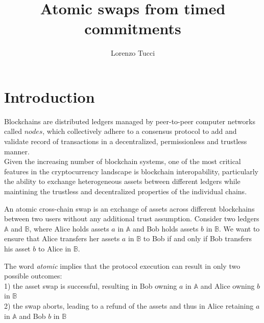 \documentclass{article}      	%
\begin{document}
         
\author{Lorenzo Tucci}
\title{Atomic swaps from timed commitments}

\maketitle

\tableofcontents
\newpage
\section{Introduction}

Blockchains are distributed ledgers managed by peer-to-peer computer networks called $nodes$, which collectively adhere to a consensus protocol to add and validate record of transactions in a decentralized, permissionless and trustless manner. \\
Given the increasing number of blockchain systems, one of the most critical features in the cryptocurrency landscape is blockchain interopability, particularly the ability to exchange heterogeneous assets between different ledgers while maintining the trustless and decentralized properties of the individual chains. 

An atomic cross-chain swap is an exchange of assets across different blockchains between two users without any additional trust assumption. 
Consider two ledgers $\mathbb{A}$ and $\mathbb{B}$, where Alice holds assets $a$ in $\mathbb{A}$ and Bob holds assets $b$ in $\mathbb{B}$. We want to ensure that Alice transfers her assets $a$ in $\mathbb{B}$ to Bob if and only if Bob transfers his asset $b$ to Alice in $\mathbb{B}$.

The word \textit{atomic} implies that the protocol execution can result in only two possible outcomes: \\
1) the asset swap is successful, resulting in Bob owning $a$ in $\mathbb{A}$ and Alice owning $b$ in $\mathbb{B}$ \\
2) the swap aborts, leading to a refund of the assets and thus in Alice retaining $a$ in $\mathbb{A}$ and Bob $b$ in $\mathbb{B}$ 
\end{document}
